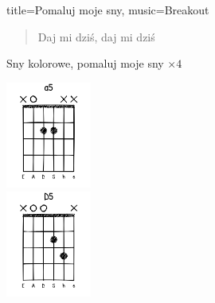 \begin{song}{title={Pomaluj moje sny}, music={Breakout}}
\begin{multicols}{2}
\begin{verse}
        Daj mi dziś, daj mi dziś
    \end{verse}
    \begin{chorus}
        Sny kolorowe, pomaluj moje sny $\times 4$
    \end{chorus}
    \vfill\null\columnbreak{}
    \begin{center}
      \includegraphics[height=3.5cm]{images/a5.png} \\
      \vspace{0.6cm}
      \includegraphics[height=3.5cm]{images/D5.png}
    \end{center}
    \end{multicols}
\end{song}

